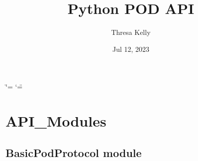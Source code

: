 \documentclass[letterpaper,10pt,english]{sphinxmanual}
\title{Python POD API}
\date{Jul 12, 2023}
\author{Thresa Kelly}
\begin{document}
\ifdefined\shorthandoff
  \ifnum\catcode`\=\string=\active\shorthandoff{=}\fi
  \ifnum\catcode`\"=\active{}\fi
\fi

\pagestyle{empty}
\sphinxmaketitle
\pagestyle{plain}
\sphinxtableofcontents
\pagestyle{normal}
\label{\detokenize{index::doc}}


\sphinxstepscope


\chapter{API\_Modules}
\label{\detokenize{modules:api-modules}}\label{\detokenize{modules::doc}}
\sphinxstepscope


\section{BasicPodProtocol module}
\label{\detokenize{BasicPodProtocol:module-BasicPodProtocol}}\label{\detokenize{BasicPodProtocol:basicpodprotocol-module}}\label{\detokenize{BasicPodProtocol::doc}}
\end{document}
